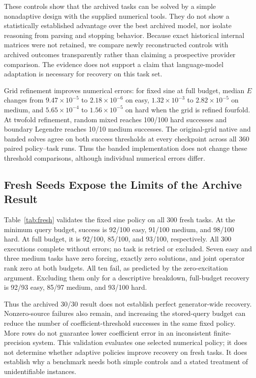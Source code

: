 \documentclass{article}
\begin{document}
These controls show that the archived tasks can be solved by a simple
nonadaptive design with the supplied numerical tools. They do not show a
statistically established advantage over the best archived model, nor isolate
reasoning from parsing and stopping behavior. Because exact historical internal
matrices were not retained, we compare newly reconstructed controls with
archived outcomes transparently rather than claiming a prospective provider
comparison. The evidence does not support a claim that language-model adaptation
is necessary for recovery on this task set.

Grid refinement improves numerical errors: for fixed sine at full budget,
median \(E\) changes from \(9.47\times10^{-5}\) to
\(2.18\times10^{-6}\) on easy, \(1.32\times10^{-3}\) to
\(2.82\times10^{-5}\) on medium, and \(5.65\times10^{-4}\) to
\(1.56\times10^{-5}\) on hard when the grid is refined fourfold.
At twofold refinement, random mixed reaches 100/100 hard successes and
boundary Legendre reaches 10/10 medium successes. The original-grid native and
banded solves agree on both success thresholds at every checkpoint across all
360 paired policy--task runs. Thus the banded implementation does not change
these threshold comparisons, although individual numerical errors differ.

\subsection{Fresh Seeds Expose the Limits of the Archive Result}

Table~\ref{tab:fresh} validates the fixed sine policy on all 300 fresh tasks.
At the minimum query budget, success is 92/100 easy, 91/100 medium, and
98/100 hard. At full budget, it is 92/100, 85/100, and 93/100, respectively.
All 300 executions complete without errors; no task is retried or excluded.
Seven easy and three medium tasks have zero forcing, exactly zero solutions,
and joint operator rank zero at both budgets. All ten fail, as predicted by the
zero-excitation argument. Excluding them only for a descriptive breakdown,
full-budget recovery is 92/93 easy, 85/97 medium, and 93/100 hard.



Thus the archived 30/30 result does not establish perfect generator-wide
recovery. Nonzero-source failures also remain, and increasing the stored-query
budget can reduce the number of coefficient-threshold successes in the same
fixed policy. More rows do not guarantee lower coefficient error in an
inconsistent finite-precision system. This validation evaluates one selected
numerical policy; it does not determine whether adaptive policies improve
recovery on fresh tasks. It does establish why a benchmark needs both simple
controls and a stated treatment of unidentifiable instances.
\end{document}
